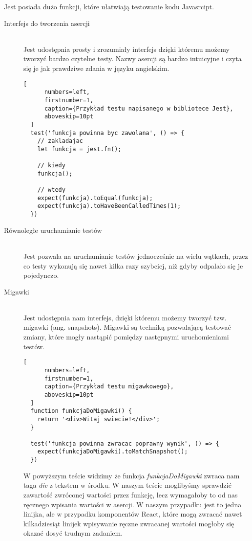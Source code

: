 Jest posiada dużo funkcji, które ułatwiają testowanie kodu Javasrcipt.
\begin{description}
  \item[Interfejs do tworzenia asercji] \hfill \\ Jest udostępnia prosty i zrozumiały interfejs dzięki któremu możemy tworzyć bardzo czytelne testy. Nazwy asercji są bardzo intuicyjne i czyta się je jak prawdziwe zdania w języku angielskim.
  \begin{addmargin}[6mm]{0mm}
  \begin{lstlisting}[
      numbers=left,
      firstnumber=1,
      caption={Przykład testu napisanego w bibliotece Jest},
      aboveskip=10pt
  ]
  test('funkcja powinna byc zawolana', () => {
    // zakladajac
    let funkcja = jest.fn();

    // kiedy
    funkcja(); 

    // wtedy
    expect(funkcja).toEqual(funkcja);
    expect(funkcja).toHaveBeenCalledTimes(1);
  })
  \end{lstlisting}
  \end{addmargin}

  \item[Równoległe uruchamianie testów] \hfill \\ Jest pozwala na uruchamianie testów jednocześnie na wielu wątkach, przez co testy wykonują się nawet kilka razy szybciej, niż gdyby odpalało się je pojedynczo.
  \item[Migawki] \hfill \\ Jest udostępnia nam interfejs, dzięki któremu możemy tworzyć tzw. migawki (ang. snapshots). Migawki są techniką pozwalającą testować zmiany, które mogły nastąpić pomiędzy następnymi uruchomieniami testów.
  \begin{addmargin}[6mm]{0mm}
  \begin{lstlisting}[
      numbers=left,
      firstnumber=1,
      caption={Przykład testu migawkowego},
      aboveskip=10pt
  ]
  function funkcjaDoMigawki() {
    return '<div>Witaj swiecie!</div>';
  }

  test('funkcja powinna zwracac poprawny wynik', () => {
    expect(funkcjaDoMigawki).toMatchSnapshot();
  })
  \end{lstlisting}
  \end{addmargin}
  W powyższym teście widzimy że funkcja \emph{funkcjaDoMigawki} zwraca nam taga \emph{div} z tekstem w środku. W naszym teście moglibyśmy sprawdzić zawartość zwróconej wartości przez funkcję, lecz wymagałoby to od nas ręcznego wpisania wartości w asercji. W naszym przypadku jest to jedna linijka, ale w przypadku komponentów React, które mogą zwracać nawet kilkadziesiąt linijek wpisywanie ręczne zwracanej wartości mogłoby się okazać dosyć trudnym zadaniem.


\end{description}
